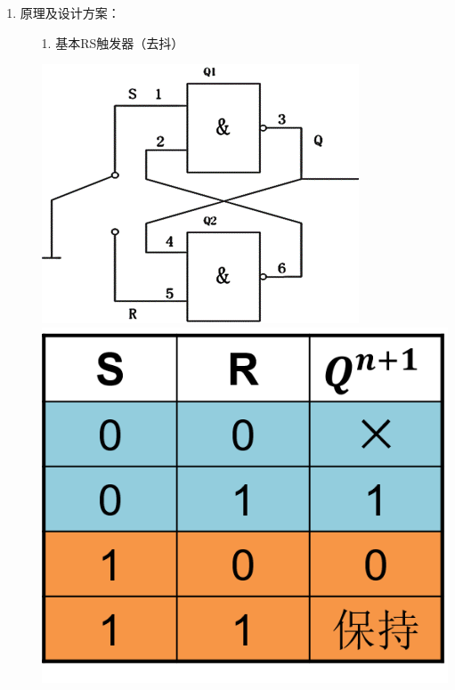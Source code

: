 \documentclass[UTF8]{ctexart}
\begin{document}
\begin{enumerate}
      \large
      \vspace{1\baselineskip}
      \item 原理及设计方案：  \\
            \begin{itemize}
                  \item [1.] 基本RS触发器（去抖） \\
                        \begin{center}  
                              \includegraphics[scale=0.6]{1.png}
                              \label{fig:label}
                              \includegraphics[scale=0.6]{2.png}
                              \label{fig:label}
                        \end{center}


\end{itemize}
\end{enumerate}
\end{document}
